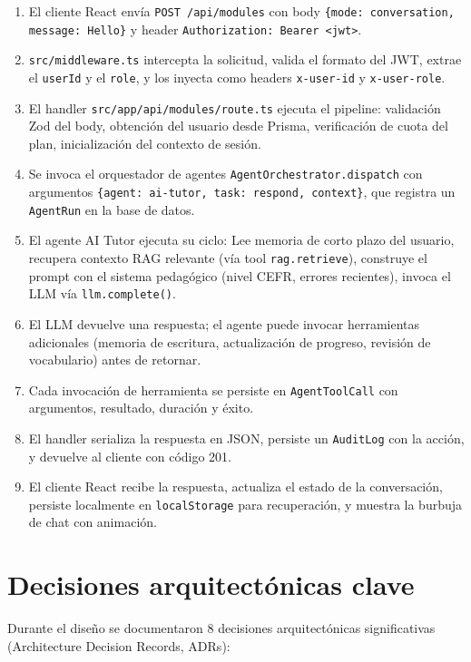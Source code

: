 \documentclass[10pt,a4paper,oneside]{report}
\begin{document}
\begin{enumerate}[leftmargin=1.6em]
\item El cliente React envía \texttt{POST /api/modules} con body \texttt{\{mode: conversation, message: Hello\}} y header \texttt{Authorization: Bearer <jwt>}.
\item \texttt{src/middleware.ts} intercepta la solicitud, valida el formato del JWT, extrae el \texttt{userId} y el \texttt{role}, y los inyecta como headers \texttt{x-user-id} y \texttt{x-user-role}.
\item El handler \texttt{src/app/api/modules/route.ts} ejecuta el pipeline: validación Zod del body, obtención del usuario desde Prisma, verificación de cuota del plan, inicialización del contexto de sesión.
\item Se invoca el orquestador de agentes \texttt{AgentOrchestrator.dispatch} con argumentos \texttt{\{agent: ai-tutor, task: respond, context\}}, que registra un \texttt{AgentRun} en la base de datos.
\item El agente AI Tutor ejecuta su ciclo: Lee memoria de corto plazo del usuario, recupera contexto RAG relevante (vía tool \texttt{rag.retrieve}), construye el prompt con el sistema pedagógico (nivel CEFR, errores recientes), invoca el LLM vía \texttt{llm.complete()}.
\item El LLM devuelve una respuesta; el agente puede invocar herramientas adicionales (memoria de escritura, actualización de progreso, revisión de vocabulario) antes de retornar.
\item Cada invocación de herramienta se persiste en \texttt{AgentToolCall} con argumentos, resultado, duración y éxito.
\item El handler serializa la respuesta en JSON, persiste un \texttt{AuditLog} con la acción, y devuelve al cliente con código 201.
\item El cliente React recibe la respuesta, actualiza el estado de la conversación, persiste localmente en \texttt{localStorage} para recuperación, y muestra la burbuja de chat con animación.
\end{enumerate}

\section{Decisiones arquitectónicas clave}
Durante el diseño se documentaron 8 decisiones arquitectónicas significativas (Architecture Decision Records, ADRs):
\end{document}
